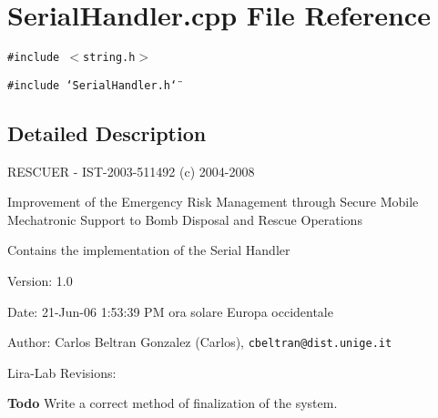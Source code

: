 \section{Serial\-Handler.cpp File Reference}
\label{SerialHandler_8cpp}
{\tt \#include $<$string.h$>$}\par
{\tt \#include \char`\"{}Serial\-Handler.h\char`\"{}}\par


\subsection{Detailed Description}
RESCUER - IST-2003-511492 (c) 2004-2008

Improvement of the Emergency Risk Management through Secure Mobile Mechatronic Support to Bomb Disposal and Rescue Operations

Contains the implementation of the Serial Handler \begin{Desc}
\item[Version:]1.0 \end{Desc}
\begin{Desc}
\item[Date:]21-Jun-06 1:53:39 PM ora solare Europa occidentale \end{Desc}
\begin{Desc}
\item[Author:]Carlos Beltran Gonzalez (Carlos), {\tt cbeltran@dist.unige.it} 

Lira-Lab Revisions: \end{Desc}
\begin{Desc}
\item[{\bf Todo}]Write a correct method of finalization of the system. \end{Desc}
